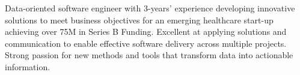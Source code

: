 

\begin{cvparagraph}


Data-oriented software engineer with 3-years’ experience developing innovative solutions to meet business objectives for an emerging healthcare start-up achieving over 75M in Series B Funding. Excellent at applying solutions and communication to enable effective software delivery across multiple projects. Strong passion for new methods and tools that transform data into actionable information.
\end{cvparagraph}
